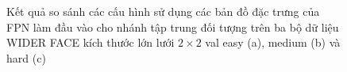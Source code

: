 {    \begin{figure}[H]
        \centering
        \caption{Kết quả so sánh các cấu hình sử dụng các bản đồ đặc trưng của FPN làm đầu vào cho nhánh tập trung đối tượng trên ba bộ dữ liệu WIDER FACE kích thước lớn lưới $2 \times 2$ val easy (a), medium (b) và hard (c)}
        \label{fig:retinafocus_widerface_4k_val_fpn}
    \end{figure}

}
